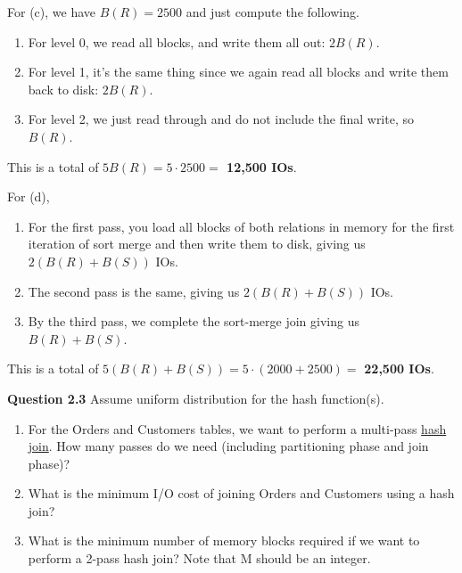 \begin{example}
    For (c), we have $B(R) = 2500$ and just compute the following. 
    \begin{enumerate}
      \item For level $0$, we read all blocks, and write them all out: $2 B(R)$. 
      \item For level 1, it's the same thing since we again read all blocks and write them back to disk: $2 B(R)$. 
      \item For level 2, we just read through and do not include the final write, so $B(R)$.
    \end{enumerate}
    This is a total of \textbf{$5 B(R) = 5 \cdot 2500 =$ 12,500 IOs}. 

    For (d), 
    \begin{enumerate}
      \item For the first pass, you load all blocks of both relations in memory for the first iteration of sort merge and then write them to disk, giving us $2 (B(R) + B(S))$ IOs. 
      \item The second pass is the same, giving us $2 (B(R) + B(S))$ IOs. 
      \item By the third pass, we complete the sort-merge join giving us $B(R) + B(S)$. 
    \end{enumerate}
    This is a total of $5 (B(R) + B(S)) = 5 \cdot (2000 + 2500) =$ \textbf{22,500 IOs}. 

    \vspace{1em}
    \noindent\textbf{Question 2.3}
    Assume uniform distribution for the hash function(s).
    \begin{enumerate}[label=(\alph*)]
        \item For the Orders and Customers tables, we want to perform a multi-pass \hyperref[def:hash-join]{hash join}. How many passes do we need (including partitioning phase and join phase)?
        
        \item What is the minimum I/O cost of joining Orders and Customers using a hash join?
        
        \item What is the minimum number of memory blocks required if we want to perform a 2-pass hash join? Note that M should be an integer.
    \end{enumerate}


\end{example}
